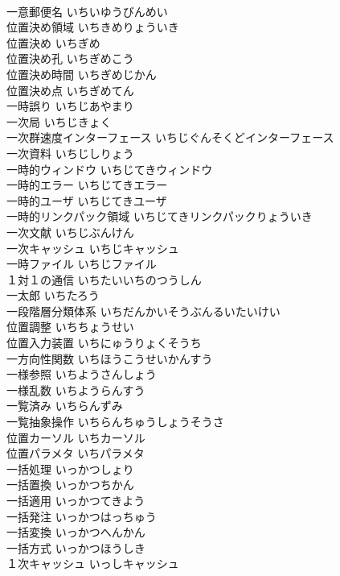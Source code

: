 \documentclass[8pt]{extreport}
\begin{document}
\begin{CJK}{UTF8}{min}
\\	一意郵便名	いちいゆうびんめい	
\\	位置決め領域	いちきめりょういき	
\\	位置決め	いちぎめ	
\\	位置決め孔	いちぎめこう	
\\	位置決め時間	いちぎめじかん	
\\	位置決め点	いちぎめてん	
\\	一時誤り	いちじあやまり	
\\	一次局	いちじきょく	
\\	一次群速度インターフェース	いちじぐんそくどインターフェース	
\\	一次資料	いちじしりょう	
\\	一時的ウィンドウ	いちじてきウィンドウ	
\\	一時的エラー	いちじてきエラー	
\\	一時的ユーザ	いちじてきユーザ	
\\	一時的リンクパック領域	いちじてきリンクパックりょういき	
\\	一次文献	いちじぶんけん	
\\	一次キャッシュ	いちじキャッシュ	
\\	一時ファイル	いちじファイル	
\\	１対１の通信	いちたいいちのつうしん	
\\	一太郎	いちたろう	
\\	一段階層分類体系	いちだんかいそうぶんるいたいけい	
\\	位置調整	いちちょうせい	
\\	位置入力装置	いちにゅうりょくそうち	
\\	一方向性関数	いちほうこうせいかんすう	
\\	一様参照	いちようさんしょう	
\\	一様乱数	いちようらんすう	
\\	一覧済み	いちらんずみ	
\\	一覧抽象操作	いちらんちゅうしょうそうさ	
\\	位置カーソル	いちカーソル	
\\	位置パラメタ	いちパラメタ	
\\	一括処理	いっかつしょり	
\\	一括置換	いっかつちかん	
\\	一括適用	いっかつてきよう	
\\	一括発注	いっかつはっちゅう	
\\	一括変換	いっかつへんかん	
\\	一括方式	いっかつほうしき	
\\	１次キャッシュ	いっしキャッシュ	

\end{CJK}
\end{document}
